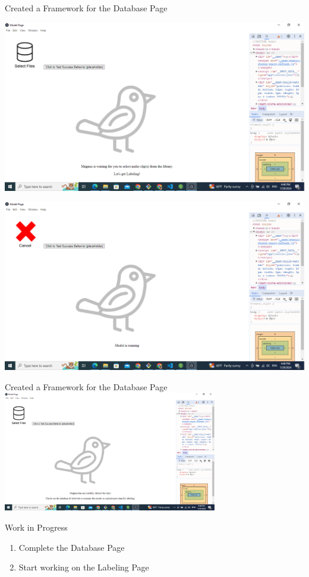 \begin{frame}{Created a Framework for the Database Page}
       \centering
       \begin{minipage}{0.45\textwidth}
            \centering
            \includegraphics[width=\linewidth]{database1.png}
        \end{minipage}
        \hfill
        \begin{minipage}{0.45\textwidth}
            \centering
            \includegraphics[width=\linewidth]{database2.png}
        \end{minipage}  
\end{frame}

\begin{frame}{Created a Framework for the Database Page}
    \centering
    \includegraphics[height=0.7\textheight,width=0.7\textwidth,keepaspectratio]{database3.png}  
\end{frame}

\begin{frame}{Work in Progress}
    \begin{enumerate}
       \item Complete the Database Page
       \item Start working on the Labeling Page
   \end{enumerate}
\end{frame}
